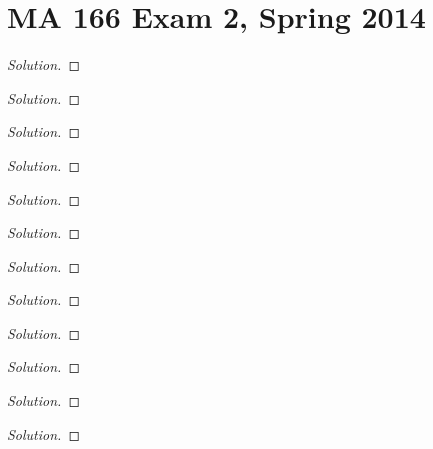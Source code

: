 \chapter{MA 166 Exam 2, Spring 2014}
\begin{problem}
\end{problem}
\begin{proof}[Solution]
\end{proof}
\begin{problem}
\end{problem}
\begin{proof}[Solution]
\end{proof}
\begin{problem}
\end{problem}
\begin{proof}[Solution]
\end{proof}
\begin{problem}
\end{problem}
\begin{proof}[Solution]
\end{proof}
\begin{problem}
\end{problem}
\begin{proof}[Solution]
\end{proof}
\begin{problem}
\end{problem}
\begin{proof}[Solution]
\end{proof}
\begin{problem}
\end{problem}
\begin{proof}[Solution]
\end{proof}
\begin{problem}
\end{problem}
\begin{proof}[Solution]
\end{proof}
\begin{problem}
\end{problem}
\begin{proof}[Solution]
\end{proof}
\begin{problem}
\end{problem}
\begin{proof}[Solution]
\end{proof}
\begin{problem}
\end{problem}
\begin{proof}[Solution]
\end{proof}
\begin{problem}
\end{problem}
\begin{proof}[Solution]
\end{proof}

